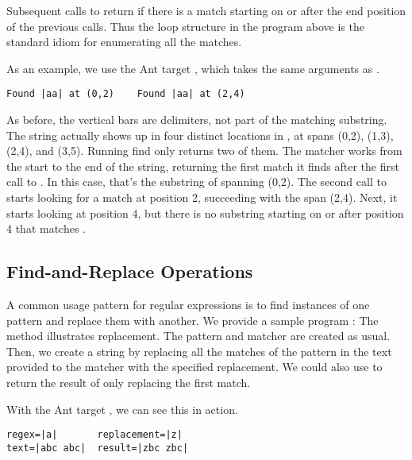 Subsequent calls to  return  if there is a
match starting on or after the end position of the previous calls.
Thus the loop structure in the program above is the standard idiom
for enumerating all the matches.  

As an example, we use the Ant target , which takes
the same arguments as .
%
%
\begin{verbatim}
Found |aa| at (0,2)    Found |aa| at (2,4)
\end{verbatim}
%
As before, the vertical bars are delimiters, not part of the matching
substring.  The string  actually shows up in four
distinct locations in , at spans (0,2), (1,3),
(2,4), and (3,5).  Running find only returns two of them.  The matcher
works from the start to the end of the string, returning the first
match it finds after the first call to .  In this case,
that's the substring of  spanning (0,2).  The
second call to  starts looking for a match at position 2,
succeeding with the span (2,4).  Next, it starts looking at position
4, but there is no substring starting on or after position 4 that
matches .

\subsection{Find-and-Replace Operations}\label{section:regex-replace}

A common usage pattern for regular expressions is to find instances of
one pattern and replace them with another.  We provide a sample
program :
%
%
The  method illustrates replacement.
%
%
The pattern and matcher are created as usual.  Then, we create
a string by replacing all the matches of the pattern in the text
provided to the matcher with the specified replacement.  We could
also use  to return the result of only replacing
the first match.

With the Ant target , we can see this in action.
%
\begin{verbatim}
regex=|a|       replacement=|z|
text=|abc abc|  result=|zbc zbc|
\end{verbatim}
%
